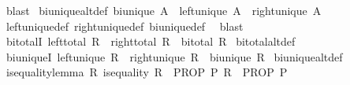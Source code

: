 \begin{isabellebody}
\ blast%
\endisatagproof
{\isafoldproof}%
%
\isadelimproof
\isanewline
%
\endisadelimproof
\isanewline
{}\isamarkupfalse%
\ bi{\isacharunderscore}{\kern0pt}unique{\isacharunderscore}{\kern0pt}alt{\isacharunderscore}{\kern0pt}def{\isacharcolon}{\kern0pt}\ {\isachardoublequoteopen}bi{\isacharunderscore}{\kern0pt}unique\ A\ {\isacharequal}{\kern0pt}\ {\isacharparenleft}{\kern0pt}left{\isacharunderscore}{\kern0pt}unique\ A\ {\isasymand}\ right{\isacharunderscore}{\kern0pt}unique\ A{\isacharparenright}{\kern0pt}{\isachardoublequoteclose}\isanewline
%
\isadelimproof
%
\endisadelimproof
%
\isatagproof
{}\isamarkupfalse%
\ left{\isacharunderscore}{\kern0pt}unique{\isacharunderscore}{\kern0pt}def\ right{\isacharunderscore}{\kern0pt}unique{\isacharunderscore}{\kern0pt}def\ bi{\isacharunderscore}{\kern0pt}unique{\isacharunderscore}{\kern0pt}def\ \isamarkupfalse%
\ blast%
\endisatagproof
{\isafoldproof}%
%
\isadelimproof
\isanewline
%
\endisadelimproof
\isanewline
{}\isamarkupfalse%
\ bi{\isacharunderscore}{\kern0pt}totalI{\isacharcolon}{\kern0pt}\ {\isachardoublequoteopen}left{\isacharunderscore}{\kern0pt}total\ R\ {\isasymLongrightarrow}\ right{\isacharunderscore}{\kern0pt}total\ R\ {\isasymLongrightarrow}\ bi{\isacharunderscore}{\kern0pt}total\ R{\isachardoublequoteclose}\isanewline
%
\isadelimproof
%
\endisadelimproof
%
\isatagproof
{}\isamarkupfalse%
\ bi{\isacharunderscore}{\kern0pt}total{\isacharunderscore}{\kern0pt}alt{\isacharunderscore}{\kern0pt}def\ \isacommand{{\isachardot}{\kern0pt}{\isachardot}{\kern0pt}}\isamarkupfalse%
%
\endisatagproof
{\isafoldproof}%
%
\isadelimproof
\isanewline
%
\endisadelimproof
\isanewline
{}\isamarkupfalse%
\ bi{\isacharunderscore}{\kern0pt}uniqueI{\isacharcolon}{\kern0pt}\ {\isachardoublequoteopen}left{\isacharunderscore}{\kern0pt}unique\ R\ {\isasymLongrightarrow}\ right{\isacharunderscore}{\kern0pt}unique\ R\ {\isasymLongrightarrow}\ bi{\isacharunderscore}{\kern0pt}unique\ R{\isachardoublequoteclose}\isanewline
%
\isadelimproof
%
\endisadelimproof
%
\isatagproof
{}\isamarkupfalse%
\ bi{\isacharunderscore}{\kern0pt}unique{\isacharunderscore}{\kern0pt}alt{\isacharunderscore}{\kern0pt}def\ \isacommand{{\isachardot}{\kern0pt}{\isachardot}{\kern0pt}}\isamarkupfalse%
%
\endisatagproof
{\isafoldproof}%
%
\isadelimproof
\isanewline
%
\endisadelimproof
\isanewline
{}\isamarkupfalse%
\isanewline
\isanewline
\isanewline
{}\isamarkupfalse%
\ is{\isacharunderscore}{\kern0pt}equality{\isacharunderscore}{\kern0pt}lemma{\isacharcolon}{\kern0pt}\ {\isachardoublequoteopen}{\isacharparenleft}{\kern0pt}{\isasymAnd}R{\isachardot}{\kern0pt}\ is{\isacharunderscore}{\kern0pt}equality\ R\ {\isasymLongrightarrow}\ PROP\ {\isacharparenleft}{\kern0pt}P\ R{\isacharparenright}{\kern0pt}{\isacharparenright}{\kern0pt}\ {\isasymequiv}\ PROP\ {\isacharparenleft}{\kern0pt}P\ {\isacharparenleft}{\kern0pt}{\isacharequal}{\kern0pt}{\isacharparenright}{\kern0pt}{\isacharparenright}{\kern0pt}{\isachardoublequoteclose}\isanewline

\end{isabellebody}
